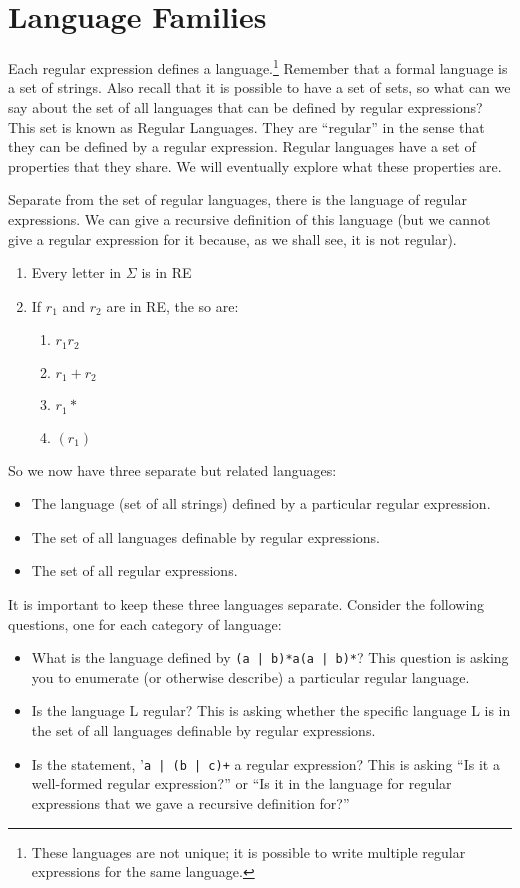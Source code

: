 \documentclass[letterpaper,12pt,openany,reqno]{book}%
\newcommand{\code}[1] {\lstinline[breaklines=yes,breakatwhitespace=yes]{#1}}
\begin{document}
\section{Language Families}
Each regular expression defines a language.\footnote{These languages are not unique; it is possible to write multiple regular expressions for the same language.} Remember that a formal language is a set of strings. Also recall that it is possible to have a set of sets, so what can we say about the set of all languages that can be defined by regular expressions? This set is known as Regular Languages. They are ``regular'' in the sense that they can be defined by a regular expression. Regular languages have a set of properties that they share. We will eventually explore what these properties are. 

Separate from the set of regular languages, there is the language of regular expressions. We can give a recursive definition of this language (but we cannot give a regular expression for it because, as we shall see, it is not regular).

\begin{enumerate}
\item Every letter in $\Sigma$ is in RE
\item If $r_1$ and $r_2$ are in RE, the so are:
\begin{enumerate}
\item $r_1 r_2$
\item $r_1 + r_2$
\item $r_1*$
\item $(r_1)$
\end{enumerate}
\end{enumerate}

So we now have three separate but related languages:
\begin{itemize}
\item The language (set of all strings) defined by a particular regular expression.
\item The set of all languages definable by regular expressions.
\item The set of all regular expressions.
\end{itemize}

It is important to keep these three languages separate. Consider the following questions, one for each category of language:
\begin{itemize}
\item What is the language defined by \code{(a | b)*a(a | b)*}? This question is asking you to enumerate (or otherwise describe) a particular regular language.
\item Is the language L regular? This is asking whether the specific language L is in the set of all languages definable by regular expressions.
\item Is the statement, '\code{a | (b | c)+} a regular expression? This is asking ``Is it a well-formed regular expression?'' or ``Is it in the language for regular expressions that we gave a recursive definition for?''
\end{itemize}
\end{document}
